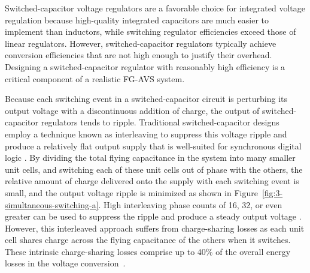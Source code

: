 \documentclass[graybox]{svmult}
\begin{document}
Switched-capacitor voltage regulators are a favorable choice for integrated voltage regulation because high-quality integrated capacitors are much easier to implement than inductors, while switching regulator efficiencies exceed those of linear regulators.
However, switched-capacitor regulators typically achieve conversion efficiencies that are not high enough to justify their overhead. 
Designing a switched-capacitor regulator with reasonably high efficiency is a critical component of a realistic FG-AVS system.

Because each switching event in a switched-capacitor circuit is perturbing its output voltage with a discontinuous addition of charge, the output of switched-capacitor regulators tends to ripple.
Traditional switched-capacitor designs employ a technique known as interleaving to suppress this voltage ripple and produce a relatively flat output supply that is well-suited for synchronous digital logic \cite{Clerc2015, Jain2014, Jiang2017, Kim2015, Song2015, Teh2016}.
By dividing the total flying capacitance in the system into many smaller unit cells, and switching each of these unit cells out of phase with the others, the relative amount of charge delivered onto the supply with each switching event is small, and the output voltage ripple is minimized as shown in Figure~\ref{fig:3-simultaneous-switching-a}.
High interleaving phase counts of 16, 32, or even greater can be used to suppress the ripple and produce a steady output voltage \cite{Andersen2014, Le2011, Pique2012}.
However, this interleaved approach suffers from charge-sharing losses as each unit cell shares charge across the flying capacitance of the others when it switches.
These intrinsic charge-sharing losses comprise up to 40\% of the overall energy losses in the voltage conversion~\cite{Jevtic2014}.
\end{document}
